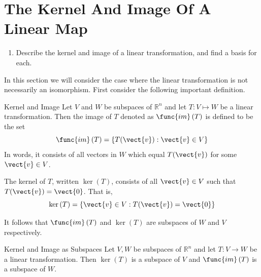 \section{The Kernel And Image Of A Linear Map}

\begin{outcome}
\begin{enumerate}
\item[A.]  Describe the kernel and image of a linear transformation, and find a basis for each. 
\end{enumerate}
\end{outcome}

In this section we will consider the case where the linear transformation is not necessarily an
isomorphism. First consider the following important definition.

\begin{definition}{Kernel and Image}\label{def:kernelimage}
Let $V$ and $W$ be subspaces of $\mathbb{R}^n$ and let $T:V\mapsto W$ be a linear transformation. Then the image of $T$
denoted as $\func{im}\left( T\right) $ is defined to be the set 
\begin{equation*}
\func{im}\left( T\right) = \left\{T (\vect{v}):\vect{v}\in V\right\}
\end{equation*}
In words, it consists of all vectors in $W$ which equal $T(\vect{v})$ for some $
\vect{v}\in V$.

The kernel of $T$, written $\ker \left( T\right) $, consists of all $\vect{v}\in V$ such that $T(\vect{v})=\vect{0}$. That is, 
\begin{equation*}
\ker \left( T\right) =\left\{ \vect{v}\in V:T(\vect{v})=\vect{0}\right\}
\end{equation*}
\end{definition}

It follows that $\func{im}\left( T\right) $ and $\ker \left( T\right) $
are subspaces of $W$ and $V$ respectively.

\begin{proposition}{Kernel and Image as Subspaces}\label{prop:kernelimagesubspaces}
Let $V, W$ be subspaces of $\mathbb{R}^n$ and let $T:V\rightarrow W$ be a linear transformation. Then $\ker \left(
T\right) $ is a subspace of $V$ and $\func{im}\left( T\right) $ is a
subspace of $W$.
\end{proposition}

